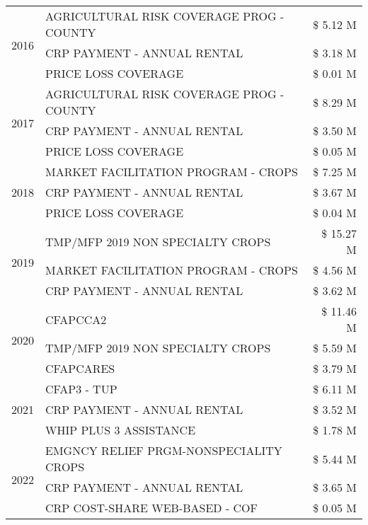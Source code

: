 \begin{tabular}{llr}
\cline{1-3}
\multirow[t]{3}{*}{2016} & AGRICULTURAL RISK COVERAGE PROG - COUNTY & \$ 5.12 M \\
 & CRP PAYMENT - ANNUAL RENTAL & \$ 3.18 M \\
 & PRICE LOSS COVERAGE & \$ 0.01 M \\
\cline{1-3}
\multirow[t]{3}{*}{2017} & AGRICULTURAL RISK COVERAGE PROG - COUNTY & \$ 8.29 M \\
 & CRP PAYMENT - ANNUAL RENTAL & \$ 3.50 M \\
 & PRICE LOSS COVERAGE & \$ 0.05 M \\
\cline{1-3}
\multirow[t]{3}{*}{2018} & MARKET FACILITATION PROGRAM - CROPS & \$ 7.25 M \\
 & CRP PAYMENT - ANNUAL RENTAL & \$ 3.67 M \\
 & PRICE LOSS COVERAGE & \$ 0.04 M \\
\cline{1-3}
\multirow[t]{3}{*}{2019} & TMP/MFP 2019 NON SPECIALTY CROPS & \$ 15.27 M \\
 & MARKET FACILITATION PROGRAM - CROPS & \$ 4.56 M \\
 & CRP PAYMENT - ANNUAL RENTAL & \$ 3.62 M \\
\cline{1-3}
\multirow[t]{3}{*}{2020} & CFAPCCA2 & \$ 11.46 M \\
 & TMP/MFP 2019 NON SPECIALTY CROPS & \$ 5.59 M \\
 & CFAPCARES & \$ 3.79 M \\
\cline{1-3}
\multirow[t]{3}{*}{2021} & CFAP3 - TUP & \$ 6.11 M \\
 & CRP PAYMENT - ANNUAL RENTAL & \$ 3.52 M \\
 & WHIP PLUS 3 ASSISTANCE & \$ 1.78 M \\
\cline{1-3}
\multirow[t]{3}{*}{2022} & EMGNCY RELIEF PRGM-NONSPECIALITY CROPS & \$ 5.44 M \\
 & CRP PAYMENT - ANNUAL RENTAL & \$ 3.65 M \\
 & CRP COST-SHARE WEB-BASED - COF & \$ 0.05 M \\
\cline{1-3}
\bottomrule
\end{tabular}
